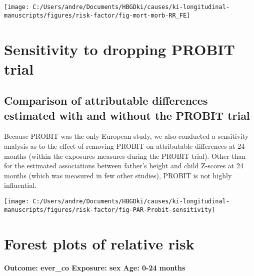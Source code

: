 \documentclass[
  9pt,
]{book}
\begin{document}
\texttt{[image: C:/Users/andre/Documents/HBGDki/causes/ki-longitudinal-manuscripts/figures/risk-factor/fig-mort-morb-RR\_FE]}

\hypertarget{no-PROBIT}{%
\chapter{Sensitivity to dropping PROBIT trial}\label{no-PROBIT}}

\raggedright

\hypertarget{comparison-of-attributable-differences-estimated-with-and-without-the-probit-trial}{%
\section{Comparison of attributable differences estimated with and without the PROBIT trial}\label{comparison-of-attributable-differences-estimated-with-and-without-the-probit-trial}}

Because PROBIT was the only European study, we also conducted a sensitivity analysis as to the effect of removing PROBIT on attributable differences at 24 months (within the exposures measures during the PROBIT trial). Other than for the estimated associations between father's height and child Z-scores at 24 months (which was measured in few other studies), PROBIT is not highly influential.

\texttt{[image: C:/Users/andre/Documents/HBGDki/causes/ki-longitudinal-manuscripts/figures/risk-factor/fig-PAR-Probit-sensitivity]}

\hypertarget{RR-forest}{%
\chapter{Forest plots of relative risk}\label{RR-forest}}

\raggedright

\hypertarget{outcome-ever_co-exposure-sex-age-0-24-months}{%
\subsubsection{Outcome: ever\_co Exposure: sex Age: 0-24 months}\label{outcome-ever_co-exposure-sex-age-0-24-months}}
\end{document}
